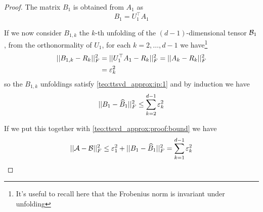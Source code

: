 \begin{Teo}
\begin{proof}
    The matrix $B_1$ is obtained from $A_1$ as
    \[
    B_1 = U_1^\top A_1
    \]

    If we now consider $B_{1,k}$ the $k$-th unfolding of the $(d-1)$-dimensional tensor $\mathcal{B}_1$, from the orthonormality of $U_1$, for each $k=2,\ldots,d-1$ we have\footnote{It's useful to recall here that the Frobenius norm is invariant under unfolding}
    \begin{equation*}
      \begin{split}
        ||B_{1,k} - R_k||_F^2 &= ||U_1^\top A_1 - R_k||_F^2 = ||A_k - R_k||_F^2\\
         &= \varepsilon_k^2
      \end{split}
    \end{equation*}
    so the $B_{1,k}$ unfoldings satisfy \ref{teo:ttsvd_approx:ip:1} and by induction we have
    \begin{equation*}
      ||B_1 - \widehat{B}_1 ||_F^2 \le \sum_{k=2}^{d-1} \varepsilon_k^2
    \end{equation*}

    If we put this together with \ref{teo:ttsvd_approx:proof:bound} we have
    \begin{equation*}
      ||\mathcal{A} - \mathcal{B}||_F^2 \le \varepsilon_1^2 + ||B_1 - \widehat{B}_1 ||_F^2 = \sum_{k=1}^{d-1} \varepsilon_k^2
    \end{equation*}
  \end{proof}
\end{Teo}

